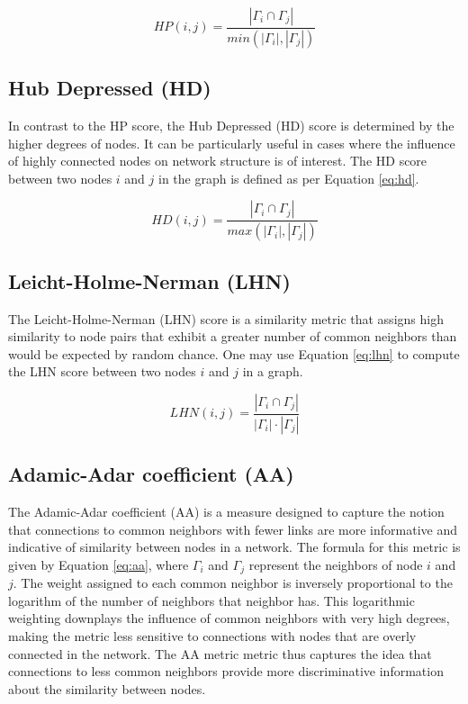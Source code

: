 \begin{equation}
\label{eq:hp}
  HP(i, j) = \frac{|\Gamma_i \cap \Gamma_j|}{min(|\Gamma_i|, |\Gamma_j|)}
\end{equation}




\subsection{Hub Depressed (HD)}

In contrast to the HP score, the Hub Depressed (HD) score \cite{zhou2009predicting} is determined by the higher degrees of nodes. It can be particularly useful in cases where the influence of highly connected nodes on network structure is of interest. The HD score between two nodes $i$ and $j$ in the graph is defined as per Equation \ref{eq:hd}.

\begin{equation}
\label{eq:hd}
  HD(i, j) = \frac{|\Gamma_i \cap \Gamma_j|}{max(|\Gamma_i|, |\Gamma_j|)}
\end{equation}




\subsection{Leicht-Holme-Nerman (LHN)}

The Leicht-Holme-Nerman (LHN) score \cite{leicht2006vertex} is a similarity metric that assigns high similarity to node pairs that exhibit a greater number of common neighbors than would be expected by random chance. One may use Equation \ref{eq:lhn} to compute the LHN score between two nodes $i$ and $j$ in a graph.

\begin{equation}
\label{eq:lhn}
  LHN(i, j) = \frac{|\Gamma_i \cap \Gamma_j|}{|\Gamma_i| \cdot |\Gamma_j|}
\end{equation}




\subsection{Adamic-Adar coefficient (AA)}

The Adamic-Adar coefficient (AA) \cite{adamic2003friends} is a measure designed to capture the notion that connections to common neighbors with fewer links are more informative and indicative of similarity between nodes in a network. The formula for this metric is given by Equation \ref{eq:aa}, where $\Gamma_i$ and $\Gamma_j$ represent the neighbors of node $i$ and $j$. The weight assigned to each common neighbor is inversely proportional to the logarithm of the number of neighbors that neighbor has. This logarithmic weighting downplays the influence of common neighbors with very high degrees, making the metric less sensitive to connections with nodes that are overly connected in the network. The AA metric metric thus captures the idea that connections to less common neighbors provide more discriminative information about the similarity between nodes.

